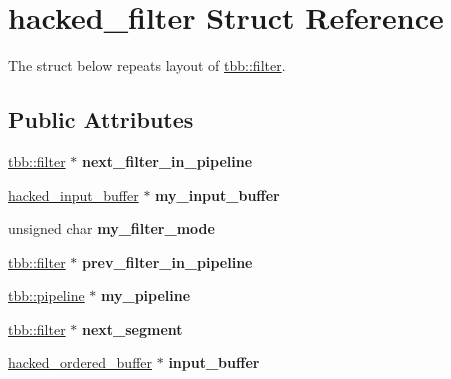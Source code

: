 \hypertarget{structhacked__filter}{}\section{hacked\+\_\+filter Struct Reference}
\label{structhacked__filter}


The struct below repeats layout of \hyperlink{classtbb_1_1filter}{tbb\+::filter}.  


\subsection*{Public Attributes}
\begin{DoxyCompactItemize}
\item 
\hypertarget{structhacked__filter_ad19abcdf57a29585fbb0f530da6e93aa}{}\hyperlink{classtbb_1_1filter}{tbb\+::filter} $\ast$ {\bfseries next\+\_\+filter\+\_\+in\+\_\+pipeline}\label{structhacked__filter_ad19abcdf57a29585fbb0f530da6e93aa}

\item 
\hypertarget{structhacked__filter_a1ff2a90ebb270c820f203b1059fcfa8d}{}\hyperlink{structhacked__input__buffer}{hacked\+\_\+input\+\_\+buffer} $\ast$ {\bfseries my\+\_\+input\+\_\+buffer}\label{structhacked__filter_a1ff2a90ebb270c820f203b1059fcfa8d}

\item 
\hypertarget{structhacked__filter_ab812fca64a43e70d08f41ffe0189a9da}{}unsigned char {\bfseries my\+\_\+filter\+\_\+mode}\label{structhacked__filter_ab812fca64a43e70d08f41ffe0189a9da}

\item 
\hypertarget{structhacked__filter_ab5d7d174def2535c8c20c4d0eec500b4}{}\hyperlink{classtbb_1_1filter}{tbb\+::filter} $\ast$ {\bfseries prev\+\_\+filter\+\_\+in\+\_\+pipeline}\label{structhacked__filter_ab5d7d174def2535c8c20c4d0eec500b4}

\item 
\hypertarget{structhacked__filter_abaa53dcc5d3929cdcd124e54577ad82f}{}\hyperlink{classtbb_1_1pipeline}{tbb\+::pipeline} $\ast$ {\bfseries my\+\_\+pipeline}\label{structhacked__filter_abaa53dcc5d3929cdcd124e54577ad82f}

\item 
\hypertarget{structhacked__filter_af4004db16c1287f6b93af0bf27061d34}{}\hyperlink{classtbb_1_1filter}{tbb\+::filter} $\ast$ {\bfseries next\+\_\+segment}\label{structhacked__filter_af4004db16c1287f6b93af0bf27061d34}

\item 
\hypertarget{structhacked__filter_a4b1b661d42afff2f3e91d9971dcf1cfa}{}\hyperlink{structhacked__ordered__buffer}{hacked\+\_\+ordered\+\_\+buffer} $\ast$ {\bfseries input\+\_\+buffer}\label{structhacked__filter_a4b1b661d42afff2f3e91d9971dcf1cfa}

\end{DoxyCompactItemize}



